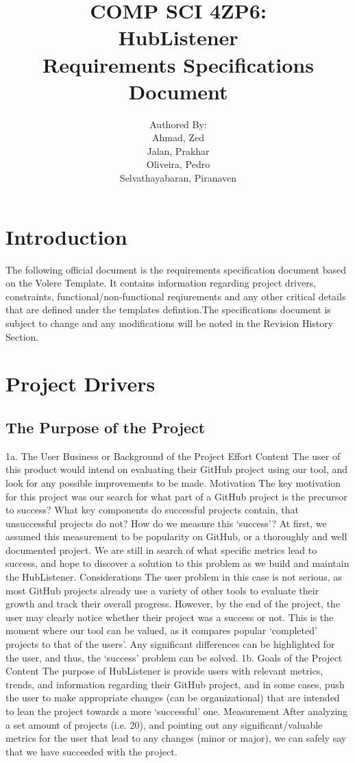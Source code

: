 \documentclass{article}
\title{COMP SCI 4ZP6:\\ \textbf{HubListener}\\ Requirements Specifications Document}
\author{ Authored By:
		\\ Ahmad, Zed
		\\ Jalan, Prakhar 
		\\ Oliveira, Pedro
		\\ Selvathayabaran, Piranaven
}
\date{}
\begin{document}
\newpage

\maketitle

\newpage
\tableofcontents {}

\section{Introduction}

The following official document is the requirements specification document based on the Volere Template. It contains information regarding project drivers, constraints, functional/non-functional reqiurements and  any other critical details that are defined under the templates defintion.The specifications document is subject to change and any modifications will be noted in the Revision History Section. 
\newpage
\section{Project Drivers}


\subsection{The Purpose of the Project}
1a. The User Business or Background of the Project Effort
Content
The user of this product would intend on evaluating their GitHub project using our tool, and look for any possible improvements to be made. 
Motivation
The key motivation for this project was our search for what part of a GitHub project is the precursor to success? What key components do successful projects contain, that unsuccessful projects do not? How do we measure this ‘success’? At first, we assumed this measurement to be popularity on GitHub, or a thoroughly and well documented project. We are still in search of what specific metrics lead to success, and hope to discover a solution to this problem as we build and maintain the HubListener.  
Considerations
The user problem in this case is not serious, as most GitHub projects already use a variety of other tools to evaluate their growth and track their overall progress. However, by the end of the project, the user may clearly notice whether their project was a success or not. This is the moment where our tool can be valued, as it compares popular ‘completed’ projects to that of the users’. Any significant differences can be highlighted for the user, and thus, the ‘success’ problem can be solved. 
1b. Goals of the Project
Content
The purpose of HubListener is provide users with relevant metrics, trends, and information regarding their GitHub project, and in some cases, push the user to make appropriate changes (can be organizational) that are intended to lean the project towards a more ‘successful’ one.
Measurement
After analyzing a set amount of projects (i.e. 20), and pointing out any significant/valuable metrics for the user that lead to any changes (minor or major), we can safely say that we have succeeded with the project.
\end{document}
